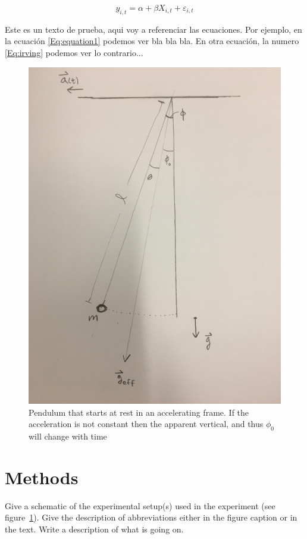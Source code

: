 \documentclass[letterpaper,12pt]{article}
\begin{document}
\begin{equation}
   y_{i,t} = \alpha + \beta X_{i,t} + \varepsilon_{i,t}
   \label{Eq:irving} %
\end{equation}

Este es un texto de prueba, aqui voy a referenciar las ecuaciones. Por
ejemplo, en la ecuación \ref{Eq:equation1} podemos ver bla bla bla.
En otra ecuación, la numero \ref{Eq:irving} podemos ver lo contrario...


\begin{figure}[!h]
    \centering
    \includegraphics[width=.8\textwidth]{pendulum.jpg}
    \caption{Pendulum that starts at rest in an accelerating frame. If the acceleration is not constant then the apparent vertical, and thus $\phi_0$ will change with time}
    \label{fig:samplesetup}
\end{figure}

\blindtext %

\section{Methods}


Give a schematic of the experimental setup(s) used in the experiment (see
figure~\ref{fig:samplesetup}). Give the description of  abbreviations
either in the figure caption or in the text. Write a description of what is
going on. 
\end{document}
